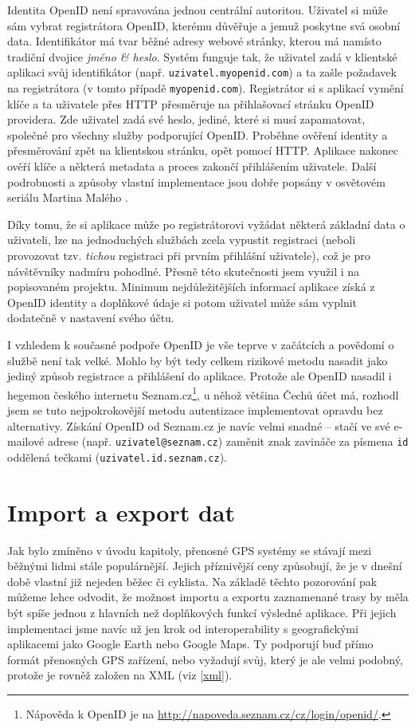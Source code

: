 Identita OpenID není spravována jednou centrální autoritou. Uživatel
si může sám vybrat registrátora OpenID, kterému důvěřuje a jemuž
poskytne svá osobní data. Identifikátor má tvar běžné adresy webové
stránky, kterou má namísto tradiční dvojice {\it jméno \& heslo}.
Systém funguje tak, že uživatel zadá v klientské aplikaci svůj
identifikátor (např. {\tt uzivatel.myopenid.com}) a ta zašle
požadavek na registrátora (v tomto případě {\tt myopenid.com}).
Registrátor si s aplikací vymění klíče a ta uživatele přes HTTP
přesměruje na přihlašovací stránku OpenID providera. Zde uživatel
zadá své heslo, jediné, které si musí zapamatovat, společné pro
všechny služby podporující OpenID. Proběhne ověření identity a
přesměrování zpět na klientskou stránku, opět pomocí HTTP. Aplikace
nakonec ověří klíče a některá metadata a proces zakončí přihlášením
uživatele. Další podrobnosti a způsoby vlastní implementace jsou
dobře popsány v osvětovém seriálu Martina Malého \cite{openid}.

Díky tomu, že si aplikace může po registrátorovi vyžádat některá
základní data o uživateli, lze na jednoduchých službách zcela
vypustit registraci (neboli provozovat tzv. {\it tichou} registraci
při prvním přihlášní uživatele), což je pro návštěvníky nadmíru
pohodlné. Přesně této skutečnosti jsem využil i na popisovaném
projektu. Minimum nej\-důležitějších informací aplikace získá z OpenID
identity a doplňkové údaje si potom uživatel může sám vyplnit
dodatečně v nastavení svého účtu.

I vzhledem k současné podpoře OpenID je vše teprve v začátcích a
povědomí o službě není tak velké. Mohlo by být tedy celkem rizikové
metodu nasadit jako jediný způsob registrace a přihlášení do aplikace.
Protože ale OpenID nasadil i hegemon českého internetu
Seznam.cz\footnote{Nápověda
k OpenID je na \url{http://napoveda.seznam.cz/cz/login/openid/}.}, u
něhož většina Čechů účet má, rozhodl jsem se tuto nej\-pokrokovější metodu autentizace implementovat opravdu bez alternativy. Získání
OpenID od Seznam.cz je navíc velmi snadné -- stačí ve své e-mailové
adrese (např. {\tt uzivatel@seznam.cz}) zaměnit znak zavináče za
písmena {\tt id} oddělená tečkami ({\tt uzivatel.id.seznam.cz}).

\section{Import a export dat}
Jak bylo zmíněno v úvodu kapitoly, přenosné GPS systémy se stávají
mezi běžnými lidmi stále populárnější. Jejich příznivější ceny
způsobují, že je v dnešní době vlastní již nejeden běžec či cyklista.
Na základě těchto pozorování pak můžeme lehce odvodit, že možnost importu a
exportu zaznamenané trasy by měla být spíše jednou z
hlavních než doplňkových funkcí výsledné aplikace. Při
jejich implementaci jsme navíc už jen krok od interoperability s
geografickými aplikacemi jako Google Earth nebo Google Maps. Ty
podporují buď přímo formát přenosných GPS zařízení, nebo vyžadují
svůj, který je ale velmi podobný, protože je rovněž založen na XML
(viz \ref{xml}).

